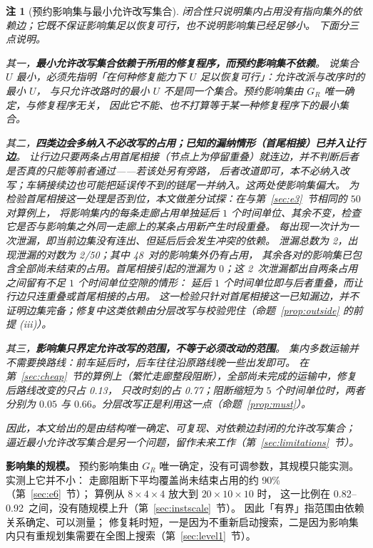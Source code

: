 \documentclass[manuscript,screen,review]{acmart}
\newcommand{\NPairs}{50}
\newcommand{\ClosureAliveFrac}{90\%}
\newcommand{\ScaleJobsHi}{20}
\newcommand{\ScaleMachHi}{10}
\newcommand{\ScaleCloAliveLo}{0.82}  %
\newcommand{\ScaleCloAliveHi}{0.92}  %
\newcommand{\ProbeLeakPairs}{2/50}
\newcommand{\ProbeLeaks}{2}
\newcommand{\ProbeOutsidePairs}{48}  %
\newcommand{\WCRouteFrac}{0.13}          %
\newcommand{\WCTimeFrac}{0.77}           %
\newtheorem{remark}{注}
\begin{document}
\begin{remark}[预约影响集与最小允许改写集合]
\label{rem:minimality}
闭合性只说明集内占用没有指向集外的依赖边；它既不保证影响集足以恢复可行，也不说明影响集已经足够小。
下面分三点说明。

其一，\textbf{最小允许改写集合依赖于所用的修复程序，而预约影响集不依赖}。
说集合 \(U\) 最小，必须先指明「在何种修复能力下 \(U\) 足以恢复可行」：允许改派与改序时的最小 \(U\)，
与只允许改路时的最小 \(U\) 不是同一个集合。预约影响集由 \(G_R\) 唯一确定，与修复程序无关，
因此它不能、也不打算等于某一种修复程序下的最小集合。

其二，\textbf{四类边会多纳入不必改写的占用；已知的漏纳情形（首尾相接）已并入让行边}。
让行边只要两条占用首尾相接（节点上为停留重叠）就连边，并不判断后者是否\emph{真的}只能等前者通过——若该处另有旁路，
后者改道即可，本不必纳入改写；车辆接续边也可能把延误传不到的链尾一并纳入。这两处使影响集偏大。
为检验首尾相接这一处理是否到位，本文做\emph{差分试探}：在与第~\ref{sec:e3}~节相同的 \(\NPairs\) 对算例上，
将影响集内的每条走廊占用单独延后 \(1\) 个时间单位、其余不变，检查它是否与影响集之外同一走廊上的某条占用新产生时段重叠。
每出现一次计为一次泄漏，即当前边集没有连出、但延后后会发生冲突的依赖。
泄漏总数为 \ProbeLeaks，出现泄漏的对数为 \ProbeLeakPairs；其中 \ProbeOutsidePairs\ 对的影响集外仍有占用，
其余各对的影响集已包含全部尚未结束的占用。首尾相接引起的泄漏为 \(0\)；这 \ProbeLeaks\ 次泄漏都出自两条占用之间留有不足 \(1\) 个时间单位空隙的情形：
延后 \(1\) 个时间单位即与后者重叠，而让行边只连重叠或首尾相接的占用。
这一检验只针对首尾相接这一已知漏边，并不证明边集完备；修复中这类依赖由分层改写与校验兜住（命题~\ref{prop:outside} 的前提 (iii)）。

其三，\textbf{影响集只界定\emph{允许}改写的范围，不等于\emph{必须}改动的范围}。
集内多数运输并不需要换路线：前车延后时，后车往往沿原路线晚一些出发即可。
在第~\ref{sec:cheap}~节的算例上（繁忙走廊整段阻断），全部尚未完成的运输中，修复后路线改变的只占 \WCRouteFrac，
只改时刻的占 \WCTimeFrac；阻断缩短为 \(5\) 个时间单位时，两者分别为 \(0.05\) 与 \(0.66\)。分层改写正是利用这一点（命题~\ref{prop:must}）。

因此，本文给出的是由结构唯一确定、可复现、对依赖边封闭的允许改写集合；
逼近最小允许改写集合是另一个问题，留作未来工作（第~\ref{sec:limitations}~节）。
\end{remark}

\textbf{影响集的规模。}
\label{sec:structure}
预约影响集由 \(G_R\) 唯一确定，没有可调参数，其规模只能实测。实测上它并不小：
走廊阻断下平均覆盖尚未结束占用的约 \ClosureAliveFrac（第~\ref{sec:e6}~节）；
算例从 \(8\times4\times4\) 放大到 \(\ScaleJobsHi\times\ScaleMachHi\times\ScaleMachHi\) 时，
这一比例在 \ScaleCloAliveLo--\ScaleCloAliveHi\ 之间，没有随规模上升（第~\ref{sec:instscale}~节）。
因此「有界」指范围由依赖关系确定、可以测量；
修复耗时短，一是因为不重新启动搜索，二是因为影响集内只有重规划集需要在全图上搜索（第~\ref{sec:level1}~节）。
\end{document}
